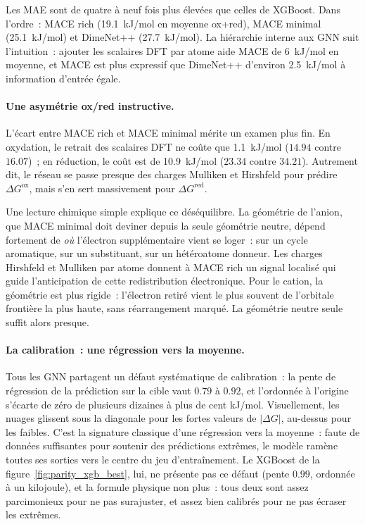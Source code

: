 Les MAE sont de quatre à neuf fois plus élevées que celles de XGBoost. Dans l'ordre~: MACE rich (\SI{19.1}{kJ/mol} en moyenne ox+red), MACE minimal (\SI{25.1}{kJ/mol}) et DimeNet++ (\SI{27.7}{kJ/mol}). La hiérarchie interne aux GNN suit l'intuition~: ajouter les scalaires DFT par atome aide MACE de \SI{6}{kJ/mol} en moyenne, et MACE est plus expressif que DimeNet++ d'environ \SI{2.5}{kJ/mol} à information d'entrée égale.

\paragraph{Une asymétrie ox/red instructive.}
L'écart entre MACE rich et MACE minimal mérite un examen plus fin. En oxydation, le retrait des scalaires DFT ne coûte que \SI{1.1}{kJ/mol} ($14.94$ contre $16.07$)~; en réduction, le coût est de \SI{10.9}{kJ/mol} ($23.34$ contre $34.21$). Autrement dit, le réseau se passe presque des charges Mulliken et Hirshfeld pour prédire $\Delta G^\text{ox}$, mais s'en sert massivement pour $\Delta G^\text{red}$.

Une lecture chimique simple explique ce déséquilibre. La géométrie de l'anion, que MACE minimal doit deviner depuis la seule géométrie neutre, dépend fortement de \emph{où} l'électron supplémentaire vient se loger~: sur un cycle aromatique, sur un substituant, sur un hétéroatome donneur. Les charges Hirshfeld et Mulliken par atome donnent à MACE rich un signal localisé qui guide l'anticipation de cette redistribution électronique. Pour le cation, la géométrie est plus rigide~: l'électron retiré vient le plus souvent de l'orbitale frontière la plus haute, sans réarrangement marqué. La géométrie neutre seule suffit alors presque.

\paragraph{La calibration~: une régression vers la moyenne.}
Tous les GNN partagent un défaut systématique de calibration~: la pente de régression de la prédiction sur la cible vaut $0.79$ à $0.92$, et l'ordonnée à l'origine s'écarte de zéro de plusieurs dizaines à plus de cent kJ/mol. Visuellement, les nuages glissent sous la diagonale pour les fortes valeurs de $|\Delta G|$, au-dessus pour les faibles. C'est la signature classique d'une régression vers la moyenne~: faute de données suffisantes pour soutenir des prédictions extrêmes, le modèle ramène toutes ses sorties vers le centre du jeu d'entraînement. Le XGBoost de la figure~\ref{fig:parity_xgb_best}, lui, ne présente pas ce défaut (pente $0.99$, ordonnée à un kilojoule), et la formule physique non plus~: tous deux sont assez parcimonieux pour ne pas surajuster, et assez bien calibrés pour ne pas écraser les extrêmes.

